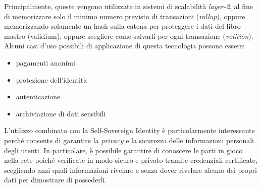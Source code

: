 \clearpage 
 
Principalmente, queste vengono utilizzate in sistemi di scalabilità \textit{layer-2}, al fine di memorizzare solo il minimo numero previsto di transazioni (\textit{rollup}),
oppure memorizzando solamente un hash sulla catena per proteggere i dati del libro mastro (validium), oppure scegliere come salvarli per ogni transazione (\textit{volition}).
Alcuni casi d'uso possibili di applicazione di questa tecnologia possono essere:
\begin{itemize}
    \item{pagamenti anonimi}
    \item{protezione dell'identità}
    \item{autenticazione}
    \item{archiviazione di dati sensibili}
\end{itemize}

L'utilizzo combinato con la Self-Sovereign Identity è particolarmente interessante perché consente di garantire la \textit{privacy} e la sicurezza delle informazioni personali degli utenti.
In particolare, è possibile garantire di conoscere le parti in gioco nella rete poiché verificate
in modo sicuro e privato tramite credenziali certificate, scegliendo anzi quali informazioni rivelare e senza
dover rivelare alcuno dei propri dati per dimostrare di possederli. 